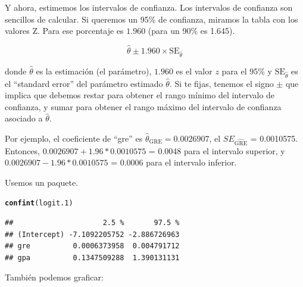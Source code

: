 \documentclass[onesided]{article}\usepackage[]{graphicx}\usepackage[]{color}
\makeatletter
\newcommand{\hlstd}[1]{\textcolor[rgb]{0.345,0.345,0.345}{#1}}%
\newcommand{\hlkwd}[1]{\textcolor[rgb]{0.737,0.353,0.396}{\textbf{#1}}}%
\newenvironment{kframe}{%
 \def\at@end@of@kframe{}%
 \ifinner\ifhmode%
  \def\at@end@of@kframe{\end{minipage}}%
  \begin{minipage}{\columnwidth}%
 \fi\fi%
 \def\FrameCommand##1{\hskip\@totalleftmargin \hskip-\fboxsep
 \colorbox{shadecolor}{##1}\hskip-\fboxsep
     \hskip-\linewidth \hskip-\@totalleftmargin \hskip\columnwidth}%
 \MakeFramed {\advance\hsize-\width
   \@totalleftmargin\z@ \linewidth\hsize
   \@setminipage}}%
 {\par\unskip\endMakeFramed%
 \at@end@of@kframe}
\newenvironment{knitrout}{}{} %
\makeatother
\begin{document}
Y ahora, estimemos los intervalos de confianza. Los intervalos de confianza son sencillos de calcular. Si queremos un 95\% de confianza, miramos la tabla con los valores Z. Para ese porcentaje es $1.960$ (para un 90\% es 1.645). 

\begin{equation}
\hat\theta \pm 1.960 \times \text{SE}_{\hat\theta}
\end{equation}

donde $\hat\theta$ es la estimaci\'on (el par\'ametro), $1.960$ es el valor $z$ para el 95\% y $\text{SE}_{\hat\theta}$ es el ``standard error'' del par\'ametro estimado $\hat\theta$. Si te fijas, tenemos el signo $\pm$ que implica que debemos restar para obtener el rango m\'inimo del intervalo de confianza, y sumar para obtener el rango m\'aximo del intervalo de confianza asociado a $\hat\theta$.

Por ejemplo, el coeficiente de ``gre'' es $\hat\theta_{\text{GRE}}=0.0026907$, el $SE_{\hat{\text{GRE}}}$ = 0.0010575. Entonces, $0.0026907 + 1.96*0.0010575$ = 0.0048 para el intervalo superior, y $0.0026907 - 1.96*0.0010575$ = 0.0006 para el intervalo inferior. 

Usemos un paquete.



\begin{knitrout}
\color{fgcolor}\begin{kframe}
\begin{alltt}
\hlkwd{confint}\hlstd{(logit.1)}
\end{alltt}
\begin{verbatim}
##                     2.5 %       97.5 %
## (Intercept) -7.1092205752 -2.886726963
## gre          0.0006373958  0.004791712
## gpa          0.1347509288  1.390131131
\end{verbatim}
\end{kframe}
\end{knitrout}

Tambi\'en podemos graficar:
\end{document}
